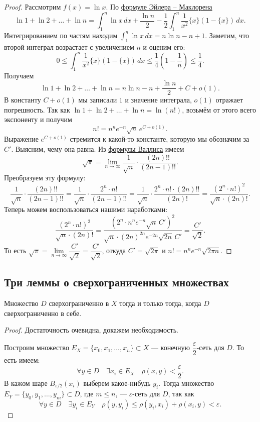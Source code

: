\begin{proof}
	Рассмотрим \(f(x) = \ln x\). По \hyperlink{eumak}{формуле Эйлера -- Маклорена} \[
	\ln 1 + \ln 2 + \ldots + \ln n = \int_1^n \ln x \, dx + \frac{\ln n}{2} - \frac{1}{2} \int_1^n \frac{1}{x^2} \{x\} (1 - \{x\}) \, dx.
	\]
	Интегрированием по частям находим \(\displaystyle\int_1^n \ln x \, dx = n \ln n - n + 1\). Заметим, что второй интеграл возрастает с увеличением \(n\) и оценим его: \[
	0 \leqslant \int_1^n \frac{1}{x^2} \{x\} (1 - \{x\}) \, dx \leqslant \frac{1}{4} \left(1 - \frac{1}{n} \right) \leqslant \frac{1}{4}.
	\]
	Получаем \[
	\ln 1 + \ln 2 + \ldots + \ln n = n \ln n - n + \frac{\ln n}{2} + C + o(1).
	\]
	В константу \(C + o(1)\) мы записали \(1\) и значение интеграла, \(o(1)\) отражает погрешность. Так как \(\ln 1 + \ln 2 + \ldots + \ln n = \ln(n!)\), возьмём от этого всего экспоненту и получим \[
	n! = n^n e^{-n} \sqrt{n} \, e^{C + o(1)}.
	\]
	Выражение \(e^{C + o(1)}\) стремится к какой-то константе, которую мы обозначим за \(C'\). Выясним, чему она равна. Из \hyperlink{wall}{формулы Валлиса} имеем \[
	\sqrt{\pi} = \lim_{n \to \infty} \frac{1}{\sqrt{n}} \cdot \frac{(2n)!!}{(2n - 1)!!}.
	\]
	Преобразуем эту формулу: \[
	\frac{1}{\sqrt{n}} \cdot \frac{(2n)!!}{(2n - 1)!!} = \frac{1}{\sqrt{n}} \cdot \frac{2^n \cdot n!}{(2n - 1)!!} = \frac{1}{\sqrt{n}} \cdot \frac{2^n \cdot n! \cdot (2n)!!}{(2n)!} = \frac{(2^n \cdot n!)^2}{\sqrt{n} \cdot (2n)!}.
	\]
	Теперь можем воспользоваться нашими наработками: \[
	\frac{(2^n \cdot n!)^2}{\sqrt{n} \cdot (2n)!} = \frac{(2^n \cdot n^n e^{-n} \sqrt{n} \, C')^2}{\sqrt{n} \cdot (2n)^{2n} e^{-2n} \sqrt{2n} \, C'} = \frac{C'}{\sqrt{2}}.
	\]
	То есть \(\sqrt{\pi} = \lim\limits_{n \to \infty} \dfrac{C'}{\sqrt{2}} = \dfrac{C'}{\sqrt{2}}\), откуда \(C' = \sqrt{2\pi}\) и \(n! = n^n e^{-n} \sqrt{2\pi n}.\) 
	
\end{proof}

\subsection{Три леммы о сверхограниченных множествах}

\begin{nlemma}
	Множество \(D\) сверхограниченно в \(X\) тогда и только тогда, когда \(D\) сверхограниченно в себе.
\end{nlemma}
\begin{proof}
	Достаточность очевидна, докажем необходимость.
	
	Построим множество \(E_X = \{x_0, x_1,\ldots, x_n\} \subset X\) --- конечную \(\dfrac{\varepsilon}{2}\)-сеть для \(D\). То есть имеем: \[
	\forall y \in D \quad \exists x_i \in E_X \quad \rho(x, y) < \frac{\varepsilon}{2}.
	\]
	В кажом шаре \(B_{\varepsilon/2} (x_i)\) выберем какое-нибудь \(y_i\). Тогда множество \(E_Y = \{y_0, y_1,\ldots, y_m\} \subset D\), где \(m \leqslant n\), --- \(\varepsilon\)-сеть для \(D\), так как \[
	\forall y \in D \quad \exists y_i \in E_Y \quad \rho(y, y_i) \leqslant \rho(y_i, x_i) + \rho(x_i, y) < \varepsilon.
	\]
\end{proof}


